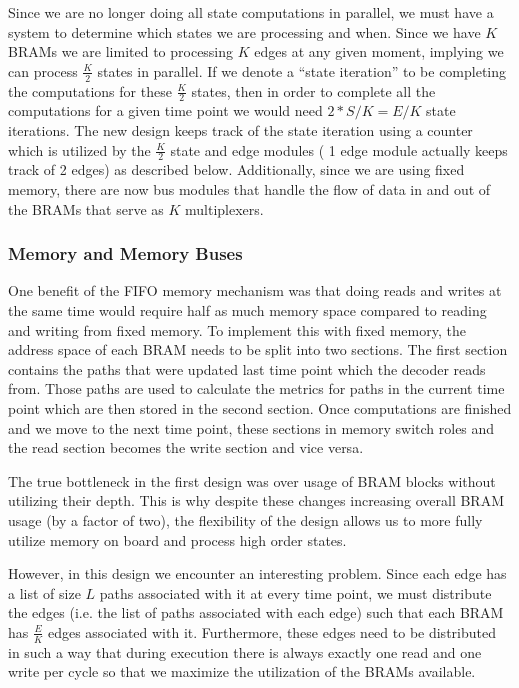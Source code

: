 Since we are no longer doing all state computations in parallel, we must have a system to determine which states we are processing and when. Since we have $K$ BRAMs we are limited to processing $K$ edges at any given moment, implying we can process $\frac{K}{2}$ states in parallel. If we denote a “state iteration” to be completing the computations for these $\frac{K}{2}$ states, then in order to complete all the computations for a given time point we would need $2*S/K = E/K$ state iterations. The new design keeps track of the state iteration using a counter which is utilized by the $\frac{K}{2}$ state and edge modules ( 1 edge module actually keeps track of 2 edges) as described below. Additionally, since we are using fixed memory, there are now bus modules that handle the flow of data in and out of the BRAMs that serve as $K$ multiplexers. 

\subsubsection{Memory and Memory Buses}
One benefit of the FIFO memory mechanism was that doing reads and writes at the same time would require half as much memory space compared to reading and writing from fixed memory. To implement this with fixed memory, the address space of each BRAM needs to be split into two sections. The first section contains the paths that were updated last time point which the decoder reads from. Those paths are used to calculate the metrics for paths in the current time point which are then stored in the second section. Once computations are finished and we move to the next time point, these sections in memory switch roles and the read section becomes the write section and vice versa.

The true bottleneck in the first design was over usage of BRAM blocks without utilizing their depth. This is why despite these changes increasing overall BRAM usage (by a factor of two), the flexibility of the design allows us to more fully utilize memory on board and process high order states.

However, in this design we encounter an interesting problem. Since each edge has a list of size $L$ paths associated with it at every time point, we must distribute the edges (i.e. the list of paths associated with each edge) such that each BRAM has $\frac{E}{K}$ edges associated with it. Furthermore, these edges need to be distributed in such a way that during execution there is always exactly one read and one write per cycle so that we maximize the utilization of the BRAMs available.

